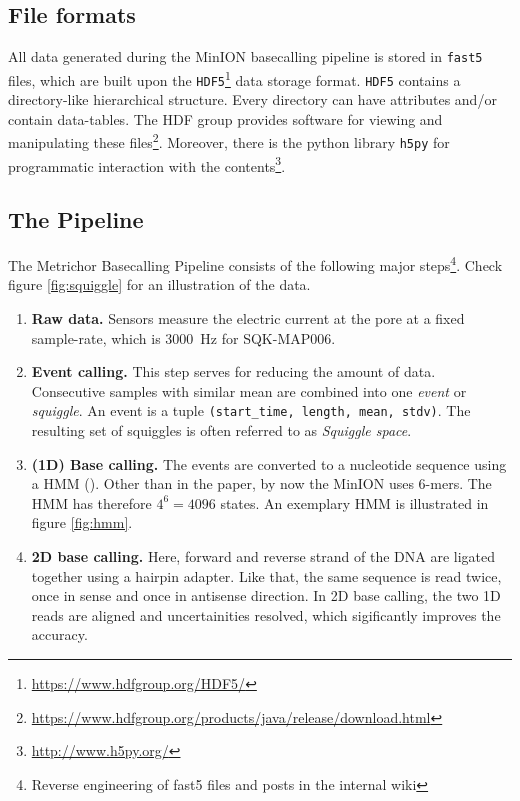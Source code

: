 \documentclass[]{scrartcl}
\begin{document}
\subsection{File formats}
All data generated during the MinION basecalling pipeline is stored in \texttt{fast5} files, which are built upon the \texttt{HDF5}\footnote{\url{https://www.hdfgroup.org/HDF5/}} data storage format. \texttt{HDF5} contains a directory-like hierarchical structure. Every directory can have attributes and/or contain data-tables. The HDF group provides software for viewing and manipulating these files\footnote{\url{https://www.hdfgroup.org/products/java/release/download.html}}. Moreover, there is the python library \texttt{h5py} for programmatic interaction with the contents\footnote{\url{http://www.h5py.org/}}.


\subsection{The Pipeline}
The Metrichor Basecalling Pipeline consists of the following major steps\footnote{Reverse engineering of fast5 files and posts in the internal wiki}. Check figure \ref{fig:squiggle} for an illustration of the data. 

\begin{enumerate}
\item \textbf{Raw data.} Sensors measure the electric current at the pore at a fixed sample-rate, which is \SI{3000}{\hertz} for SQK-MAP006.
\item \textbf{Event calling.} This step serves for reducing the amount of data. Consecutive samples with similar mean are combined into one \textit{event} or \textit{squiggle}. An event is a tuple \texttt{(start\_time, length, mean, stdv)}. The resulting set of squiggles is often referred to as \textit{Squiggle space}. 
\item \textbf{(1D) Base calling.} The events are converted to a nucleotide sequence using a HMM (\cite{Timp2012a}). Other than in the paper, by now the MinION uses 6-mers. The HMM has therefore $4^6 = 4096$ states. An exemplary HMM is illustrated in figure \ref{fig:hmm}. 
\item \textbf{2D base calling.} Here, forward and reverse strand of the DNA are ligated together using a hairpin adapter. Like that, the same sequence is read twice, once in sense and once in antisense direction. In 2D base calling, the two 1D reads are aligned and uncertainities resolved, which sigificantly improves the accuracy. 
\end{enumerate}
\end{document}
